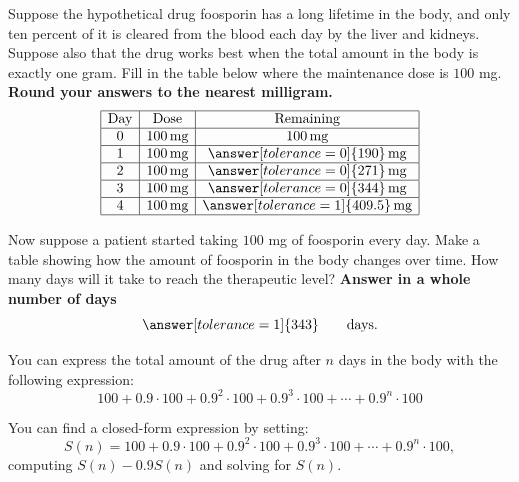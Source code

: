 \documentclass[space,handout]{ximera}
\begin{document}
\newpage
\begin{question}
  Suppose the hypothetical drug foosporin has a long lifetime in the
  body, and only ten percent of it is cleared from the blood each day
  by the liver and kidneys. Suppose also that the drug works best when
  the total amount in the body is exactly one gram. Fill in the table
  below where the maintenance dose is $100$ mg. \textbf{Round your answers to the
  nearest milligram.}
  \[
  \begin{array}{|c|c|c|}
    \hline
    \text{Day} & \text{Dose} & \text{Remaining} \\ \hline
    0  & 100\,\text{mg} & 100\,\text{mg} \\ \hline
    1  & 100\,\text{mg} & \answer[tolerance=0]{190}\,\text{mg}\\ \hline
    2  & 100\,\text{mg} & \answer[tolerance=0]{271}\,\text{mg}\\ \hline
    3  & 100\,\text{mg} & \answer[tolerance=0]{344}\,\text{mg}\\ \hline
    4  & 100\,\text{mg} & \answer[tolerance=1]{409.5}\,\text{mg}\\ \hline
  \end{array}
  \]
\end{question}

\begin{question}
Now suppose a patient started taking $100$ mg of foosporin every day.
Make a table showing how the amount of foosporin in the body changes
over time.  How many days will it take to reach the therapeutic level?
\textbf{Answer in a whole number of days}
\[
\answer[tolerance=1]{343}\qquad\text{days.}
\]
\begin{hint}
  You can express the total amount of the drug after $n$ days in the
  body with the following expression:
  \[
  100 + 0.9\cdot 100 + 0.9^2 \cdot 100 + 0.9^3 \cdot 100 +\cdots + 0.9^n \cdot 100
  \]
\end{hint}
\begin{hint}
  You can find a closed-form expression by setting:
  \[
  S(n)= 100 + 0.9\cdot 100 + 0.9^2 \cdot 100 + 0.9^3 \cdot 100 +\cdots + 0.9^n \cdot 100,
  \]
  computing $S(n) - 0.9 S(n)$ and solving for $S(n)$.
\end{hint}
\end{question}
\end{document}
